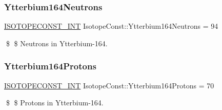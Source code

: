 \subsubsection{\texorpdfstring{Ytterbium164\+Neutrons}{Ytterbium164Neutrons}}
{\footnotesize\ttfamily \mbox{\hyperlink{group___isotope_const-_macros_ga5f18360b3e99483a35c32d789e62621c}{I\+S\+O\+T\+O\+P\+E\+C\+O\+N\+S\+T\+\_\+\+I\+NT}} Isotope\+Const\+::\+Ytterbium164\+Neutrons = 94}

\$ \$ Neutrons in Ytterbium-\/164. \mbox{\label{group___isotope_const-_ytterbium-_yb164_ga3eb1e6402e8a1c664640dc2f162842f9}} 
\subsubsection{\texorpdfstring{Ytterbium164\+Protons}{Ytterbium164Protons}}
{\footnotesize\ttfamily \mbox{\hyperlink{group___isotope_const-_macros_ga5f18360b3e99483a35c32d789e62621c}{I\+S\+O\+T\+O\+P\+E\+C\+O\+N\+S\+T\+\_\+\+I\+NT}} Isotope\+Const\+::\+Ytterbium164\+Protons = 70}

\$ \$ Protons in Ytterbium-\/164. 